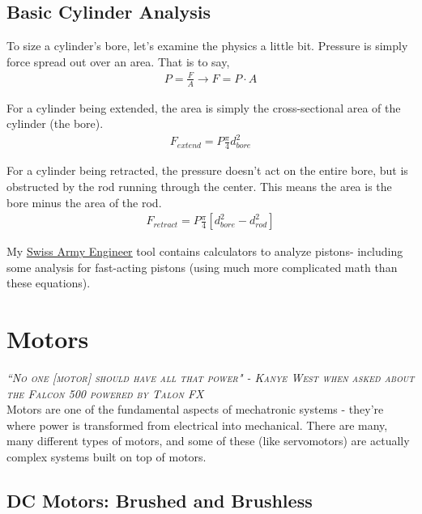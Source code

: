\documentclass[10pt,letterpaper]{book}
\begin{document}
\section{Basic Cylinder Analysis}

To size a cylinder's bore, let's examine the physics a little bit. Pressure is simply force spread out over an area. That is to say,
\begin{align}
	P = \frac{F}{A} \rightarrow F = P \cdot A
\end{align}

For a cylinder being extended, the area is simply the cross-sectional area of the cylinder (the bore).
\begin{align}
	F_{extend} = P \frac{\pi}{4} d_{bore}^2
\end{align}

For a cylinder being retracted, the pressure doesn't act on the entire bore, but is obstructed by the rod running through the center. This means the area is the bore minus the area of the rod.
\begin{align}
	F_{retract} = P \frac{\pi}{4} [ d_{bore}^2 - d_{rod}^2 ]
\end{align}

My \href{http://thaddeus-maximus.github.io/swissarmyengineer/}{\color{red}\underline{Swiss Army Engineer}} tool contains calculators to analyze pistons- including some analysis for fast-acting pistons (using much more complicated math than these equations).















\chapter{Motors}

 {\slshape \scshape ``No one [motor] should have all that power" - Kanye West when asked about the Falcon 500 powered by Talon FX}
 \\
 
 Motors are one of the fundamental aspects of mechatronic systems - they're where power is transformed from electrical into mechanical. There are many, many different types of motors, and some of these (like servomotors) are actually complex systems built on top of motors.

\section{DC Motors: Brushed and Brushless}
\end{document}

